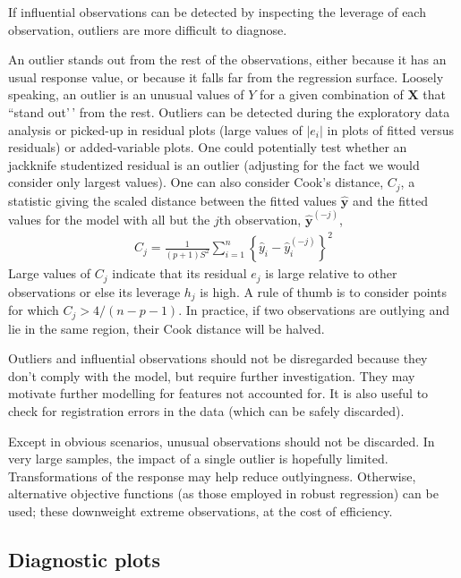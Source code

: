 \documentclass[
  11pt,
  letterpaper,
]{book}
\theoremstyle{definition}
\theoremstyle{definition}
\theoremstyle{definition}
\theoremstyle{remark}
\begin{document}
If influential observations can be detected by inspecting the leverage of each observation, outliers are more difficult to diagnose.

An outlier stands out from the rest of the observations, either because it has an usual response value, or because it falls far from the regression surface.
Loosely speaking, an outlier is an unusual values of \(Y\) for a given combination of \(\mathbf{X}\) that ``stand out'\,' from the rest.
Outliers can be detected during the exploratory data analysis or picked-up in residual plots (large values of \(|e_i|\) in plots of fitted versus residuals) or added-variable plots. One could potentially test whether an jackknife studentized residual is an outlier (adjusting for the fact we would consider only largest values). One can also consider Cook's distance, \(C_j\), a statistic giving the scaled distance between the fitted values \(\hat{\boldsymbol{y}}\) and the fitted values for the model with all but the \(j\)th observation, \(\hat{\boldsymbol{y}}^{(-j)}\),
\begin{align*}
C_j = \frac{1}{(p+1)S^2} \sum_{i=1}^n \left\{\hat{y}_i - \hat{y}_{i}^{(-j)}\right\}^2
\end{align*}
Large values of \(C_j\) indicate that its residual \(e_j\) is large relative to other observations or else its leverage \(h_j\) is high. A rule of thumb is to consider points for which \(C_j > 4/(n-p-1)\). In practice, if two observations are outlying and lie in the same region, their Cook distance will be halved.

Outliers and influential observations should not be disregarded because they don't comply with the model, but require further investigation. They may motivate further modelling for features not accounted for. It is also useful to check for registration errors in the data (which can be safely discarded).

Except in obvious scenarios, unusual observations should not be discarded. In very large samples, the impact of a single outlier is hopefully limited. Transformations of the response may help reduce outlyingness. Otherwise, alternative objective functions (as those employed in robust regression) can be used; these downweight extreme observations, at the cost of efficiency.

\hypertarget{diagnostic-plots}{%
\subsection{Diagnostic plots}\label{diagnostic-plots}}
\end{document}

